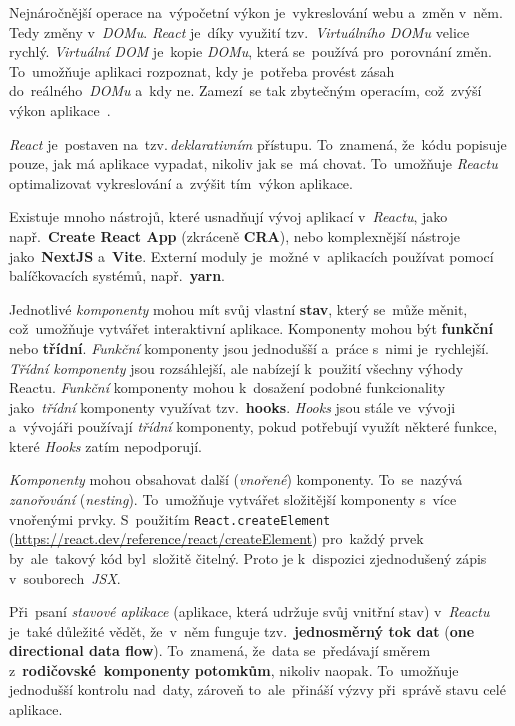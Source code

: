 \documentclass[11pt,a4paper]{report}
\begin{document}
            Nejnáročnější operace na~výpočetní výkon je~vykreslování webu a~změn v~něm. Tedy změny v~\emph{DOMu}. \emph{React} je~díky využití tzv.~\emph{Virtuálního DOMu} velice rychlý. \emph{Virtuální DOM} je~kopie \emph{DOMu}, která se~používá pro~porovnání změn. To~umožňuje aplikaci rozpoznat, kdy je~potřeba provést zásah do~reálného~\emph{DOMu} a~kdy ne. Zamezí~se tak zbytečným operacím, což~zvýší výkon aplikace~\cite{elrom2021react}.
            
            \emph{React} je~postaven na~tzv.\,\emph{deklarativním} přístupu. To~znamená, že~kódu popisuje pouze, jak má aplikace vypadat, nikoliv jak se~má chovat. To~umožňuje \emph{Reactu} optimalizovat vykreslování a~zvýšit tím~výkon aplikace.
            
            Existuje mnoho nástrojů, které usnadňují vývoj aplikací v~\emph{Reactu}, jako např.~\textbf{Create React App} (zkráceně \textbf{CRA}), nebo komplexnější nástroje jako~\textbf{NextJS} a~\textbf{Vite}. Externí moduly je~možné v~aplikacích používat pomocí balíčkovacích systémů, např.~\textbf{yarn}.

            Jednotlivé \emph{komponenty} mohou mít svůj vlastní \textbf{stav}, který se~může měnit, což~umožňuje vytvářet interaktivní aplikace. Komponenty mohou být \textbf{funkční} nebo \textbf{třídní}. \emph{Funkční} komponenty jsou jednodušší a~práce s~nimi je~rychlejší. \emph{Třídní komponenty} jsou rozsáhlejší, ale nabízejí k~použití všechny výhody Reactu. \emph{Funkční} komponenty mohou k~dosažení podobné funkcionality jako~\emph{třídní} komponenty využívat tzv.~\textbf{hooks}. \emph{Hooks} jsou stále ve~vývoji a~vývojáři používají \emph{třídní} komponenty, pokud potřebují využít některé funkce, které \emph{Hooks} zatím nepodporují.

            \emph{Komponenty} mohou obsahovat další (\emph{vnořené}) komponenty. To~se~nazývá \emph{zanořování} (\emph{nesting}). To~umožňuje vytvářet složitější komponenty s~více vnořenými prvky. S~použitím \texttt{React.createElement} (\url{https://react.dev/reference/react/createElement}) pro~každý prvek by~ale~takový kód byl~složitě čitelný. Proto je k~dispozici zjednodušený zápis v~souborech~\emph{JSX}.

            Při~psaní \emph{stavové aplikace} (aplikace, která udržuje svůj vnitřní stav) v~\emph{Reactu} je~také důležité vědět, že~v~něm funguje tzv.~\textbf{jednosměrný tok dat} (\textbf{one directional data flow}). To~znamená, že~data se~předávají směrem z~\textbf{rodičovské~komponenty} \textbf{potomkům}, nikoliv naopak. To~umožňuje jednodušší kontrolu nad~daty, zároveň to~ale~přináší výzvy při~správě stavu celé aplikace.
            
\end{document}
